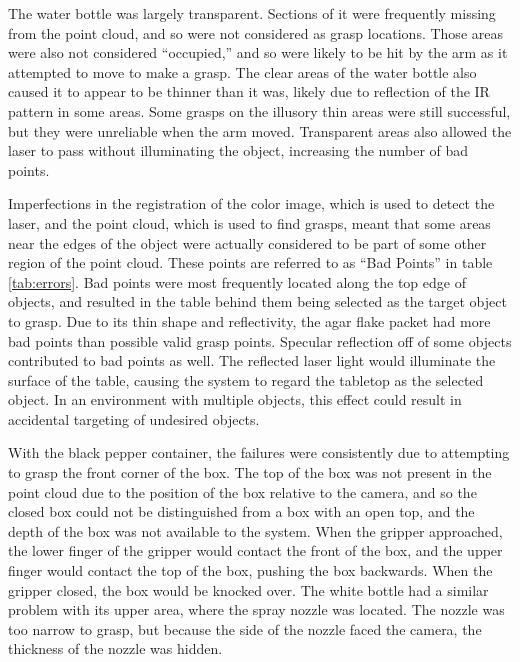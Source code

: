 \documentclass[letterpaper, 10 pt, conference]{ieeeconf}
\begin{document}
The water bottle was largely transparent. 
Sections of it were frequently missing from the point cloud, and so were not considered as grasp locations. 
Those areas were also not considered ``occupied,'' and so were likely to be hit by the arm as it attempted to move to make a grasp. 
The clear areas of the water bottle also caused it to appear to be thinner than it was, likely due to reflection of the IR pattern in some areas. 
Some grasps on the illusory thin areas were still successful, but they were unreliable when the arm moved. 
Transparent areas also allowed the laser to pass without illuminating the object, increasing the number of bad points. 

Imperfections in the registration of the color image, which is used to detect the laser, and the point cloud, which is used to find grasps, meant that some areas near the edges of the object were actually considered to be part of some other region of the point cloud. 
These points are referred to as ``Bad Points'' in table \ref{tab:errors}. 
Bad points were most frequently located along the top edge of objects, and resulted in the table behind them being selected as the target object to grasp. 
Due to its thin shape and reflectivity, the agar flake packet had more bad points than possible valid grasp points. 
Specular reflection off of some objects contributed to bad points as well. 
The reflected laser light would illuminate the surface of the table, causing the system to regard the tabletop as the selected object. 
In an environment with multiple objects, this effect could result in accidental targeting of undesired objects. 

With the black pepper container, the failures were consistently due to attempting to grasp the front corner of the box.
The top of the box was not present in the point cloud due to the position of the box relative to the camera, and so the closed box could not be distinguished from a box with an open top, and the depth of the box was not available to the system. 
When the gripper approached, the lower finger of the gripper would contact the front of the box, and the upper finger would contact the top of the box, pushing the box backwards. 
When the gripper closed, the box would be knocked over.
The white bottle had a similar problem with its upper area, where the spray nozzle was located.
The nozzle was too narrow to grasp, but because the side of the nozzle faced the camera, the thickness of the nozzle was hidden. 
\end{document}
